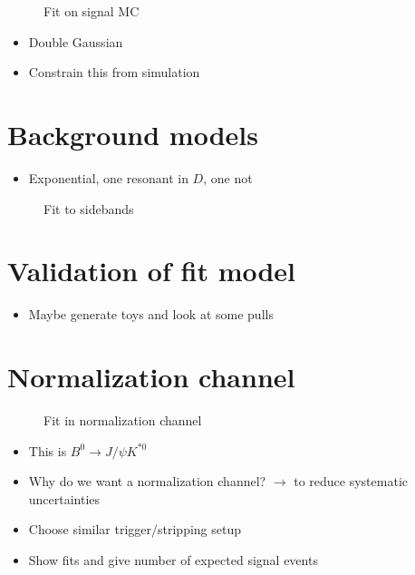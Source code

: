 \begin{figure}
  \centering
  \missingfigure[figwidth=\textwidth]{}
  \caption{Fit on signal MC}
\end{figure}

\begin{itemize}
  \item Double Gaussian
  \item Constrain this from simulation
\end{itemize}

\section{Background models}

\begin{itemize}
  \item Exponential, one resonant in $D$, one not
\end{itemize}

\begin{figure}
  \centering
  \missingfigure[figwidth=\textwidth]{}
  \caption{Fit to sidebands}
\end{figure}

\section{Validation of fit model}

\begin{itemize}
  \item Maybe generate toys and look at some pulls
\end{itemize}

\section{Normalization channel}

\begin{figure}
  \centering
  \missingfigure[figwidth=\textwidth]{}
  \caption{Fit in normalization channel}
\end{figure}

\begin{itemize}
  \item This is $B^0\to J/ψK^{*0}$
  \item Why do we want a normalization channel? $\rightarrow$ to reduce systematic uncertainties
  \item Choose similar trigger/stripping setup
  \item Show fits and give number of expected signal events
\end{itemize}

